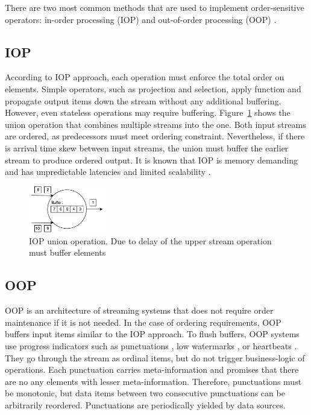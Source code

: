 
\label {fs-typical}

There are two  most common methods that are used to implement order-sensitive operators: in-order processing (IOP) \cite{Arasu:2006:CCQ:1146461.1146463, Cranor:2003:GSD:872757.872838, hammad2004optimizing} and out-of-order processing (OOP) \cite{Li:2008:OPN:1453856.1453890}.

\subsection{IOP}

According to IOP approach, each operation must enforce the total order on elements. Simple operators, such as projection and selection, apply function and propagate output items down the stream without any additional buffering. However, even stateless operations may require buffering. Figure~\ref{iop} shows the union operation that combines multiple streams into the one. Both input streams are ordered, as predecessors must meet ordering constraint. Nevertheless, if there is arrival time skew between input streams, the union must buffer the earlier stream to produce ordered output. It is known that IOP is memory demanding and has unpredictable latencies and limited scalability \cite{Li:2008:OPN:1453856.1453890}.

\begin{figure}[htbp]
  \centering
  \includegraphics[width=0.30\textwidth]{pics/iop}
  \caption{IOP union operation. Due to delay of the upper stream operation must buffer elements}
  \label {iop}
\end{figure}

\subsection{OOP}

OOP is an architecture of streaming systems that does not require order maintenance if it is not needed. In the case of ordering requirements, OOP buffers input items similar to the IOP approach. To flush buffers, OOP systems use progress indicators such as punctuations \cite{Tucker:2003:EPS:776752.776780}, low watermarks \cite{Akidau:2013:MFS:2536222.2536229}, or heartbeats \cite{Srivastava:2004:FTM:1055558.1055596}. They go through the stream as ordinal items, but do not trigger business-logic of operations. Each punctuation carries meta-information and promises that there are no any elements with lesser meta-information. Therefore, punctuations must be monotonic, but data items between two consecutive punctuations can be arbitrarily reordered. Punctuations are periodically yielded by data sources.

